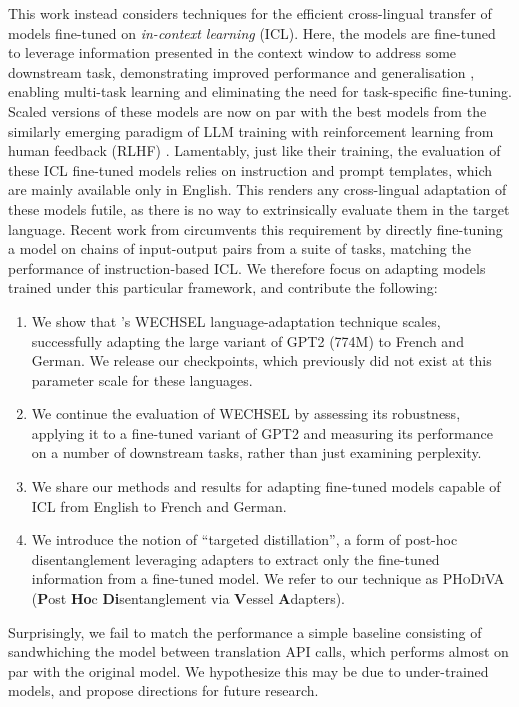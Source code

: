 \documentclass[11pt]{article}
\begin{document}
This work instead considers techniques for the efficient cross-lingual transfer of models fine-tuned
on \textit{in-context learning} (ICL). Here, the models are fine-tuned to leverage information
presented in the context window to address some downstream task, demonstrating improved performance
and generalisation \citep{wei_finetuned_2021,sanh_multitask_2022,wang_benchmarking_2022}, enabling
multi-task learning and eliminating the need for task-specific fine-tuning. Scaled versions of these
models \citep{chung_scaling_2022} are now on par with the best models from the similarly emerging
paradigm of LLM training with reinforcement learning from human feedback (RLHF)
\citep{ouyang_training_2022}. Lamentably, just like their training, the evaluation of these ICL
fine-tuned models relies on instruction and prompt templates, which are mainly available only in
English. This renders any cross-lingual adaptation of these models futile, as there is no way to
extrinsically evaluate them in the target language. Recent work from \citet{min_metaicl_2022}
circumvents this requirement by directly fine-tuning a model on chains of input-output pairs from
a suite of tasks, matching the performance of instruction-based ICL. We therefore focus on adapting
models trained under this particular framework, and contribute the following:
\begin{enumerate}
	\item We show that \citet{minixhofer_wechsel_2022}'s WECHSEL language-adaptation technique scales,
	      successfully adapting the large variant of GPT2 (774M) to French and German. We release our
	      checkpoints, which previously did not exist at this parameter scale for these languages.
	\item We continue the evaluation of WECHSEL by assessing its robustness, applying it to
	      a fine-tuned variant of GPT2 and measuring its performance on a number of downstream tasks,
	      rather than just examining perplexity.
	\item We share our methods and results for adapting fine-tuned models capable of ICL from English to
	      French and German.
	\item We introduce the notion of ``targeted distillation'', a form of post-hoc disentanglement
	      leveraging adapters \citep{houlsby_parameter-efficient_2019} to extract only the fine-tuned
	      information from a fine-tuned model.  We refer to our technique as \textsc{PHoDiVA}
	      (\textbf{P}ost \textbf{Ho}c \textbf{Di}sentanglement via \textbf{V}essel \textbf{A}dapters).
\end{enumerate}
Surprisingly, we fail to match the performance a simple baseline consisting of sandwhiching the
model between translation API calls, which performs almost on par with the original model. We
hypothesize this may be due to under-trained models, and propose directions for future research.
\end{document}
